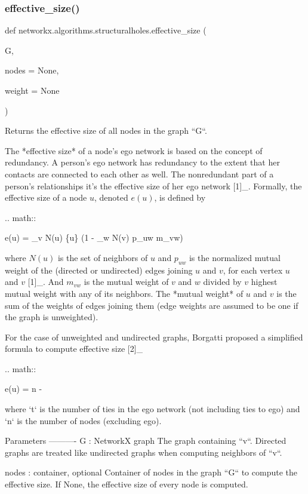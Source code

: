 \subsubsection{\texorpdfstring{effective\+\_\+size()}{effective\_size()}}
{\footnotesize\ttfamily def networkx.\+algorithms.\+structuralholes.\+effective\+\_\+size (\begin{DoxyParamCaption}\item[{}]{G,  }\item[{}]{nodes = {\ttfamily None},  }\item[{}]{weight = {\ttfamily None} }\end{DoxyParamCaption})}

\begin{DoxyVerb}Returns the effective size of all nodes in the graph ``G``.

The *effective size* of a node's ego network is based on the concept
of redundancy. A person's ego network has redundancy to the extent
that her contacts are connected to each other as well. The
nonredundant part of a person's relationships it's the effective
size of her ego network [1]_.  Formally, the effective size of a
node $u$, denoted $e(u)$, is defined by

.. math::

   e(u) = \sum_{v \in N(u) \setminus \{u\}}
   \left(1 - \sum_{w \in N(v)} p_{uw} m_{vw}\right)

where $N(u)$ is the set of neighbors of $u$ and $p_{uw}$ is the
normalized mutual weight of the (directed or undirected) edges
joining $u$ and $v$, for each vertex $u$ and $v$ [1]_. And $m_{vw}$
is the mutual weight of $v$ and $w$ divided by $v$ highest mutual
weight with any of its neighbors. The *mutual weight* of $u$ and $v$
is the sum of the weights of edges joining them (edge weights are
assumed to be one if the graph is unweighted).

For the case of unweighted and undirected graphs, Borgatti proposed
a simplified formula to compute effective size [2]_

.. math::

   e(u) = n - 

where `t` is the number of ties in the ego network (not including
ties to ego) and `n` is the number of nodes (excluding ego).

Parameters
----------
G : NetworkX graph
    The graph containing ``v``. Directed graphs are treated like
    undirected graphs when computing neighbors of ``v``.

nodes : container, optional
    Container of nodes in the graph ``G`` to compute the effective size.
    If None, the effective size of every node is computed.


\end{DoxyVerb}
